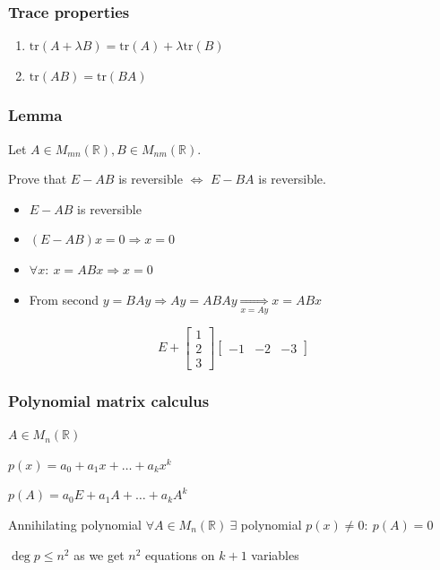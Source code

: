 \documentclass[fullscreen=true, bookmarks=true, hyperref={pdfencoding=unicode}]{beamer}
\begin{document}
\begin{frame}
  \frametitle{Trace properties}
  \begin{enumerate}
    \item $\mathrm{tr}(A + \lambda B) = \mathrm{tr}(A) + \lambda \mathrm{tr}(B)$
    \item $\mathrm{tr}(AB) = \mathrm{tr}(BA)$
  \end{enumerate}
\end{frame}


\begin{frame}
 \frametitle{Lemma}
    Let $A \in M_{mn}(\mathbb{R}), B \in M_{nm}(\mathbb{R})$.
    
    Prove that $E - AB$ is reversible $\Leftrightarrow$ $E - BA$ is reversible.

  \pause
  \begin{itemize}
    \item $E - AB$ is reversible \pause
    \item $(E - AB)x=0 \Rightarrow x=0$ \pause
    \item $\forall x:\ x = ABx \Rightarrow x=0$ \pause
    \item From second $y=BAy \Rightarrow Ay=ABAy \underset{x=Ay}{\Rightarrow} x = ABx$
  \end{itemize}

  \begin{example}
    $$E + \begin{bmatrix}
      1 \\ 2 \\ 3
    \end{bmatrix}
    \begin{bmatrix}
      -1 & -2 & -3
    \end{bmatrix}$$
  \end{example}
\end{frame}

\begin{frame}
  \frametitle{Polynomial matrix calculus}
  $A \in M_{n}(\mathbb{R})$

  $p(x) = a_0 + a_1x + \dots + a_k x^k$

  $p(A) = a_0E + a_1A + \dots + a_k A^k$

  \vspace{1cm}\pause
  \begin{block}{Annihilating polynomial}
    $\forall A \in M_{n}(\mathbb{R})\ \exists$ polynomial $p(x) \neq 0:\ p(A) = 0$
  \end{block}

  $\deg p \leq n^2$ as we get $n^2$ equations on $k+1$ variables
\end{frame}
\end{document}

